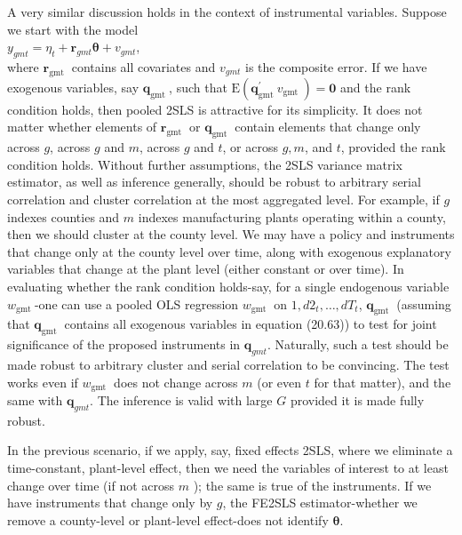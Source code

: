 \documentclass[10pt]{article}
\begin{document}
A very similar discussion holds in the context of instrumental variables. Suppose we start with the model\\
$y_{g m t}=\eta_{t}+\mathbf{r}_{g m t} \boldsymbol{\theta}+v_{g m t}$,\\
where $\mathbf{r}_{\text {gmt }}$ contains all covariates and $v_{g m t}$ is the composite error. If we have exogenous variables, say $\mathbf{q}_{\text {gmt }}$, such that $\mathrm{E}\left(\mathbf{q}_{\text {gmt }}^{\prime} v_{\text {gmt }}\right)=\mathbf{0}$ and the rank condition holds, then pooled 2SLS is attractive for its simplicity. It does not matter whether elements of $\mathbf{r}_{\text {gmt }}$ or $\mathbf{q}_{\text {gmt }}$ contain elements that change only across $g$, across $g$ and $m$, across $g$ and $t$, or across $g, m$, and $t$, provided the rank condition holds. Without further assumptions, the 2SLS variance matrix estimator, as well as inference generally, should be robust to arbitrary serial correlation and cluster correlation at the most aggregated level. For example, if $g$ indexes counties and $m$ indexes manufacturing plants operating within a county, then we should cluster at the county level. We may have a policy and instruments that change only at the county level over time, along with exogenous explanatory variables that change at the plant level (either constant or over time). In evaluating whether the rank condition holds-say, for a single endogenous variable $w_{\text {gmt }}$-one can use a pooled OLS regression $w_{\text {gmt }}$ on $1, d 2_{t}, \ldots, d T_{t}$, $\mathbf{q}_{\text {gmt }}$ (assuming that $\mathbf{q}_{\text {gmt }}$ contains all exogenous variables in equation (20.63)) to test for joint significance of the proposed instruments in $\mathbf{q}_{g m t}$. Naturally, such a test should be made robust to arbitrary cluster and serial correlation to be convincing. The test works even if $w_{\text {gmt }}$ does not change across $m$ (or even $t$ for that matter), and the same with $\mathbf{q}_{g m t}$. The inference is valid with large $G$ provided it is made fully robust.

In the previous scenario, if we apply, say, fixed effects 2SLS, where we eliminate a time-constant, plant-level effect, then we need the variables of interest to at least change over time (if not across $m$ ); the same is true of the instruments. If we have instruments that change only by $g$, the FE2SLS estimator-whether we remove a county-level or plant-level effect-does not identify $\boldsymbol{\theta}$.
\end{document}
